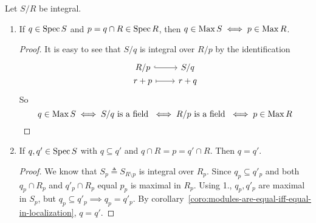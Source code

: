\begin{prop} \label{prop:property-of-contraction-if-integral}
  Let $S/R$ be integral.
  \begin{enumerate}
    \item If $q \in \operatorname{Spec} S$ and $p = q \cap R \in \operatorname{Spec} R$, then
      $q \in \operatorname{Max} S \iff p \in \operatorname{Max} R$.

    \begin{proof}
      It is easy to see that $S/q$ is integral over $R/p$ by the identification
      \[
        \begin{tikzcd}[column sep=0.8cm,row sep=0ex]
          R/p \arrow[r, hookrightarrow] & S/q \\
          r+p \arrow[r, mapsto] & r+q
        \end{tikzcd}
      \]
      So \[ q \in \operatorname{Max} S \iff S/q \text{ is a field } \iff R/p \text{ is a field } \iff p \in \operatorname{Max} R \]
    \end{proof}
    \item If $q, q' \in \operatorname{Spec} S$ with $q \subseteq q'$ and $q \cap R = p = q' \cap R$.
      Then $q = q'$.
    \begin{proof}
      We know that $S_p \triangleq S_{R \setminus p}$ is integral over $R_p$.
      Since $q_p \subseteq q'_p$ and both $q_p \cap R_p$ and $q'_p \cap R_p$
      equal $p_p$ is maximal in $R_p$. Using 1., $q_p, q'_p$ are maximal
      in $S_p$, but $q_p \subseteq q'_p \implies q_p = q'_p$.
      By corollary~\ref{coro:modules-are-equal-iff-equal-in-localization},
      $q = q'$.
    \end{proof}
  \end{enumerate}

\end{prop}


